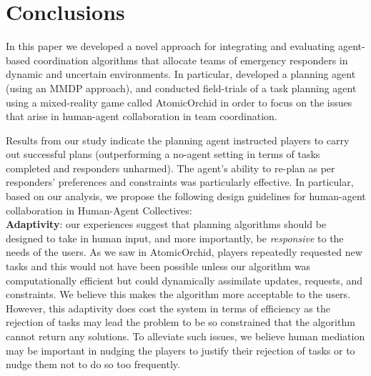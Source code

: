\section{Conclusions}\label{sec:conclusions}
\noindent In this paper we developed a novel approach for integrating and evaluating agent-based coordination algorithms that allocate teams of emergency responders in dynamic and uncertain environments.  In particular, developed a planning agent (using an MMDP approach), and conducted field-trials of a task planning agent using a mixed-reality game  called AtomicOrchid in order to focus on the issues that arise in human-agent collaboration in team coordination.

Results from our study indicate  the planning agent instructed players to carry out successful plans (outperforming a no-agent setting in terms of tasks completed and responders unharmed). The agent's ability to re-plan  as per responders' preferences and constraints was particularly effective. In particular, based on our analysis, we propose the following design guidelines for human-agent collaboration in Human-Agent Collectives:\\

\noindent \textbf{Adaptivity}: our experiences suggest that planning algorithms should be designed to take in human input, and more importantly, be \emph{responsive} to the needs of the users. As we saw in AtomicOrchid, players repeatedly requested new tasks and this would not have been possible unless our algorithm  was computationally efficient but could dynamically assimilate updates, requests, and constraints. We believe this makes the algorithm more acceptable to the users. However, this adaptivity does cost the system in terms of efficiency as the rejection of tasks may lead the problem to be so constrained that the algorithm cannot return any solutions. To alleviate such issues, we believe human mediation may be important in nudging the players to justify their rejection of tasks or to nudge them not to do so too frequently. \\

